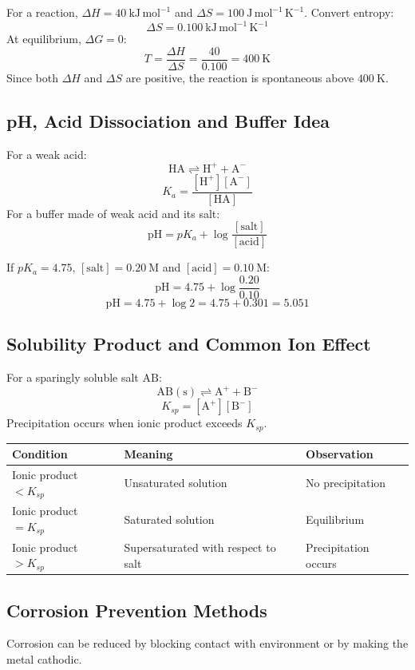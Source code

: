 \documentclass[12pt,a4paper]{article}
\begin{document}
\begin{tcolorbox}[examplebox, title={Solved Example: Temperature of Spontaneity}]
For a reaction, $\Delta H=40\ \mathrm{kJ\,mol^{-1}}$ and $\Delta S=100\ \mathrm{J\,mol^{-1}\,K^{-1}}$.
Convert entropy:
\[
\Delta S=0.100\ \mathrm{kJ\,mol^{-1}\,K^{-1}}
\]
At equilibrium, $\Delta G=0$:
\[
T=\frac{\Delta H}{\Delta S}=\frac{40}{0.100}=400\ \mathrm{K}
\]
Since both $\Delta H$ and $\Delta S$ are positive, the reaction is spontaneous above $400\ \mathrm{K}$.
\end{tcolorbox}

\subsection{pH, Acid Dissociation and Buffer Idea}
For a weak acid:
\[
\mathrm{HA\rightleftharpoons H^+ + A^-}
\]
\[
K_a=\frac{[\mathrm{H^+}][\mathrm{A^-}]}{[\mathrm{HA}]}
\]
For a buffer made of weak acid and its salt:
\[
\mathrm{pH}=pK_a+\log\frac{[\mathrm{salt}]}{[\mathrm{acid}]}
\]

\begin{tcolorbox}[examplebox, title={Solved Example: Buffer pH}]
If $pK_a=4.75$, $[\mathrm{salt}]=0.20\ \mathrm{M}$ and $[\mathrm{acid}]=0.10\ \mathrm{M}$:
\[
\mathrm{pH}=4.75+\log\frac{0.20}{0.10}
\]
\[
\mathrm{pH}=4.75+\log2=4.75+0.301=5.051
\]
\end{tcolorbox}

\subsection{Solubility Product and Common Ion Effect}
For a sparingly soluble salt $\mathrm{AB}$:
\[
\mathrm{AB(s)\rightleftharpoons A^+ + B^-}
\]
\[
K_{sp}=[\mathrm{A^+}][\mathrm{B^-}]
\]
Precipitation occurs when ionic product exceeds $K_{sp}$.

\begin{tabularx}{\linewidth}{|B{3.2cm}|Y|Y|}
\hline
\textbf{Condition} & \textbf{Meaning} & \textbf{Observation} \\
\hline
Ionic product $<K_{sp}$ & Unsaturated solution & No precipitation \\
\hline
Ionic product $=K_{sp}$ & Saturated solution & Equilibrium \\
\hline
Ionic product $>K_{sp}$ & Supersaturated with respect to salt & Precipitation occurs \\
\hline
\end{tabularx}

\subsection{Corrosion Prevention Methods}
Corrosion can be reduced by blocking contact with environment or by making the metal cathodic.
\end{document}
